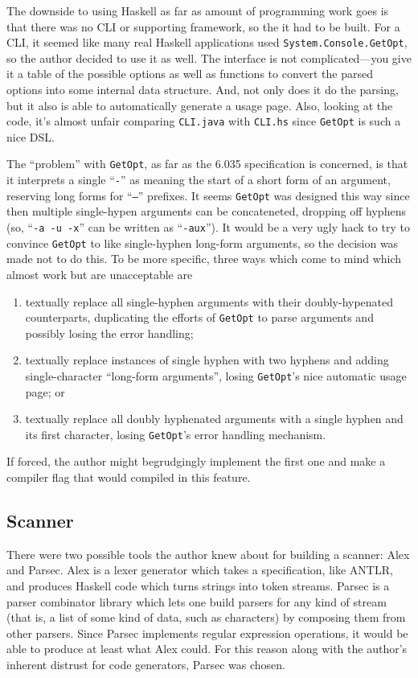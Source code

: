 \documentclass[11pt]{article}
\begin{document}
The downside to using Haskell as far as amount of programming work
goes is that there was no CLI or supporting framework, so the it had
to be built.  For a CLI, it seemed like many real Haskell applications
used \texttt{System.Console.GetOpt}, so the author decided to use it
as well.  The interface is not complicated---you give it a table of
the possible options as well as functions to convert the parsed
options into some internal data structure.  And, not only does it do
the parsing, but it also is able to automatically generate a usage
page. Also, looking at the code, it's almost unfair comparing
\texttt{CLI.java} with \texttt{CLI.hs} since \texttt{GetOpt} is such a
nice DSL.

The ``problem'' with \texttt{GetOpt}, as far as the 6.035
specification is concerned, is that it interprets a single
``\texttt{-}'' as meaning the start of a short form of an argument,
reserving long forms for ``\texttt{--}'' prefixes.  It seems
\texttt{GetOpt} was designed this way since then multiple single-hypen
arguments can be concateneted, dropping off hyphens (so, ``\texttt{-a
  -u -x}'' can be written as ``\texttt{-aux}''). It would be a very
ugly hack to try to convince \texttt{GetOpt} to like single-hyphen
long-form arguments, so the decision was made not to do this.  To be
more specific, three ways which come to mind which almost work but are
unacceptable are
\begin{enumerate}
\item textually replace all single-hyphen arguments with their
  doubly-hypenated counterparts, duplicating the efforts of
  \texttt{GetOpt} to parse arguments and possibly losing the error
  handling;
\item textually replace instances of single hyphen with two hyphens
  and adding single-character ``long-form arguments'', losing
  \texttt{GetOpt}'s nice automatic usage page; or
\item textually replace all doubly hyphenated arguments with a single
  hyphen and its first character, losing \texttt{GetOpt}'s error
  handling mechanism.
\end{enumerate}
If forced, the author might begrudgingly implement the first one and
make a compiler flag that would compiled in this feature.

\subsection{Scanner}
\label{sec:scanner}

There were two possible tools the author knew about for building a
scanner: Alex and Parsec.  Alex is a lexer generator which takes a
specification, like ANTLR, and produces Haskell code which turns
strings into token streams.  Parsec is a parser combinator library
which lets one build parsers for any kind of stream (that is, a list
of some kind of data, such as characters) by composing them from other
parsers.  Since Parsec implements regular expression operations, it
would be able to produce at least what Alex could.  For this reason
along with the author's inherent distrust for code generators, Parsec
was chosen.
\end{document}
